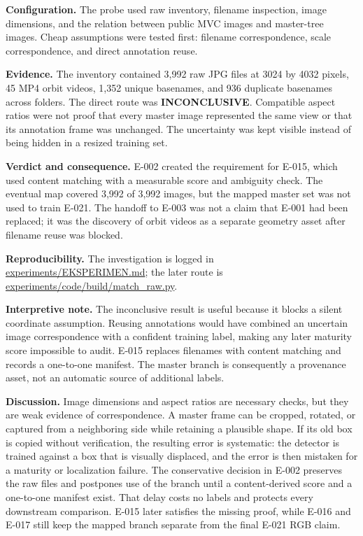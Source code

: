 \documentclass[preprint,12pt]{elsarticle}
\newcommand{\pathcode}[1]{\scriptsize\url{#1}}
\begin{document}
\textbf{Configuration.} The probe used raw inventory, filename inspection,
image dimensions, and the relation between public MVC images and master-tree
images. Cheap assumptions were tested first: filename correspondence, scale
correspondence, and direct annotation reuse.

\textbf{Evidence.} The inventory contained 3,992 raw JPG files at 3024 by
4032 pixels, 45 MP4 orbit videos, 1,352 unique basenames, and 936 duplicate
basenames across folders. The direct route was \textbf{INCONCLUSIVE}. Compatible
aspect ratios were not proof that every master image represented the same view
or that its annotation frame was unchanged. The uncertainty was kept visible
instead of being hidden in a resized training set.

\textbf{Verdict and consequence.} E-002 created the requirement for E-015,
which used content matching with a measurable score and ambiguity check. The
eventual map covered 3,992 of 3,992 images, but the mapped master set was not
used to train E-021. The handoff to E-003 was not a claim that E-001 had been
replaced; it was the discovery of orbit videos as a separate geometry asset
after filename reuse was blocked.

\textbf{Reproducibility.} The investigation is logged in
\pathcode{experiments/EKSPERIMEN.md}; the later route is
\pathcode{experiments/code/build/match_raw.py}.

\textbf{Interpretive note.} The inconclusive result is useful because it
blocks a silent coordinate assumption. Reusing annotations would have
combined an uncertain image correspondence with a confident training label,
making any later maturity score impossible to audit. E-015 replaces
filenames with content matching and records a one-to-one manifest. The
master branch is consequently a provenance asset, not an automatic source of
additional labels.

\textbf{Discussion.} Image dimensions and aspect ratios are necessary checks,
but they are weak evidence of correspondence. A master frame can be cropped,
rotated, or captured from a neighboring side while retaining a plausible
shape. If its old box is copied without verification, the resulting error is
systematic: the detector is trained against a box that is visually displaced,
and the error is then mistaken for a maturity or localization failure. The
conservative decision in E-002 preserves the raw files and postpones use of
the branch until a content-derived score and a one-to-one manifest exist.
That delay costs no labels and protects every downstream comparison. E-015
later satisfies the missing proof, while E-016 and E-017 still keep the
mapped branch separate from the final E-021 RGB claim.
\end{document}
